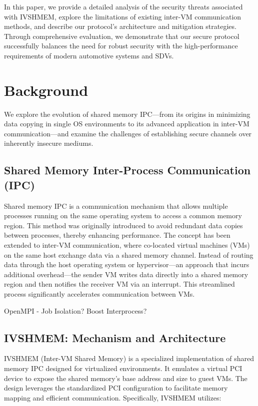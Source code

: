 \documentclass[letterpaper,twocolumn,10pt]{article}
\begin{document}
In this paper, we provide a detailed analysis of the security threats associated with IVSHMEM, explore the limitations of existing inter-VM communication methods, and describe our protocol's architecture and mitigation strategies. Through comprehensive evaluation, we demonstrate that our secure protocol successfully balances the need for robust security with the high-performance requirements of modern automotive systems and SDVs.

\section{Background}

We explore the evolution of shared memory IPC—from its origins in minimizing data copying in single OS environments to its advanced application in inter-VM communication—and examine the challenges of establishing secure channels over inherently insecure mediums.

\subsection{Shared Memory Inter-Process Communication (IPC)}

Shared memory IPC is a communication mechanism that allows multiple processes running on the same operating system to access a common memory region. This method was originally introduced to avoid redundant data copies between processes, thereby enhancing performance. The concept has been extended to inter-VM communication, where co-located virtual machines (VMs) on the same host exchange data via a shared memory channel. Instead of routing data through the host operating system or hypervisor—an approach that incurs additional overhead—the sender VM writes data directly into a shared memory region and then notifies the receiver VM via an interrupt. This streamlined process significantly accelerates communication between VMs.


OpenMPI - Job Isolation?
Boost Interprocess?

\subsection{IVSHMEM: Mechanism and Architecture}


IVSHMEM (Inter-VM Shared Memory) is a specialized implementation of shared memory IPC designed for virtualized environments. It emulates a virtual PCI device to expose the shared memory's base address and size to guest VMs. The design leverages the standardized PCI configuration to facilitate memory mapping and efficient communication. Specifically, IVSHMEM utilizes:
\end{document}
